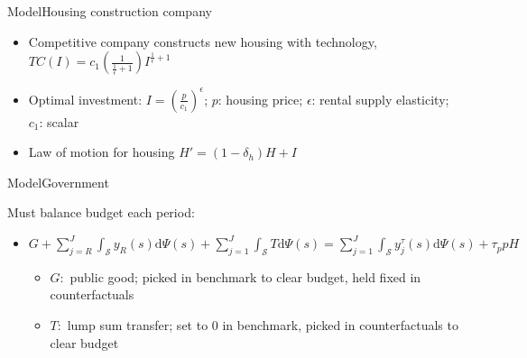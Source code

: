 \documentclass[11pt,aspectratio=169]{beamer}
\begin{document}
\begin{frame}{Model}{Housing construction company}

\begin{itemize}
    \item Competitive company constructs new housing with technology, $TC(I)=c_{1}\left(\frac{1}{\frac{1}{\epsilon}+1}\right)I^{\frac{1}{\epsilon}+1}$
    \item Optimal investment: $I=\left(\frac{p}{c_{1}}\right)^{\epsilon}$; $p$: housing price; $\epsilon$: rental supply elasticity; $c_{1}$: scalar
    \item Law of motion for housing $H'=(1-\delta_{h})H+I$
\end{itemize}

\end{frame}

\begin{frame}{Model}{Government}

Must balance budget each period:
\begin{itemize}
    \item $G + \sum_{j=R}^J \int_\mathcal{S} y_{R}(s) \mathrm{d}\Psi(s) + \sum_{j=1}^J \int_\mathcal{S} T \mathrm{d}\Psi(s) = \sum_{j=1}^J \int_\mathcal{S}y^{\tau}_{j}(s) \mathrm{d}\Psi(s)+\tau_p p H$
    \begin{itemize}
        \item $G:$ public good; picked in benchmark to clear budget, held fixed in counterfactuals
        \item $T:$ lump sum transfer; set to 0 in benchmark, picked in counterfactuals to clear budget
    \end{itemize}
\end{itemize}

\end{frame}
\end{document}
